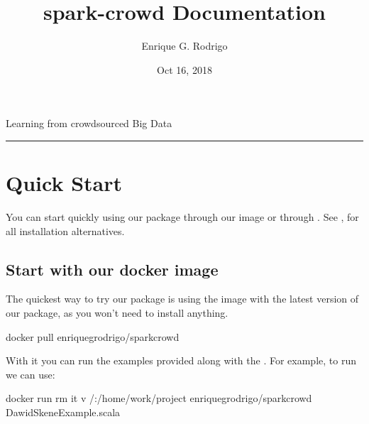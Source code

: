 \documentclass[letterpaper,10pt,english]{sphinxmanual}
\title{spark-crowd Documentation}
\date{Oct 16, 2018}
\author{Enrique G. Rodrigo}
\begin{document}
\pagestyle{empty}
\maketitle
\pagestyle{plain}
\sphinxtableofcontents
\pagestyle{normal}
\label{\detokenize{index::doc}}


Learning from crowdsourced Big Data


\bigskip\hrule\bigskip



\chapter{Quick Start}
\label{\detokenize{usage/quickstart:quick-start}}\label{\detokenize{usage/quickstart:quickstart}}\label{\detokenize{usage/quickstart::doc}}
You can start quickly using our package through our  image or through .
See {\hyperref[\detokenize{usage/installation:installation}]{}}, for all installation alternatives.


\section{Start with our docker image}
\label{\detokenize{usage/quickstart:start-with-our-docker-image}}
The quickest way to try our package is using the  image with the latest
version of our package, as you won’t need to install anything.

%
\begin{sphinxVerbatim}[commandchars=\\\{\}]
docker pull enriquegrodrigo/spark\PYGZhy{}crowd
\end{sphinxVerbatim}

With it you can run the examples provided along with the . For example, to run 
we can use:

%
\begin{sphinxVerbatim}[commandchars=\\\{\}]
docker run \PYGZhy{}\PYGZhy{}rm \PYGZhy{}it \PYGZhy{}v /:/home/work/project enriquegrodrigo/spark\PYGZhy{}crowd DawidSkeneExample.scala
\end{sphinxVerbatim}
\end{document}
